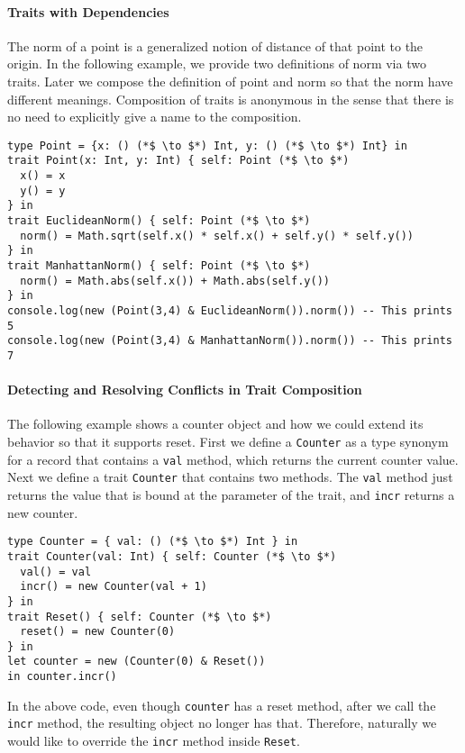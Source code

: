 \paragraph{Traits with Dependencies}
The norm of a point is a generalized notion of distance of that point to the
origin. In the following example, we provide two definitions of norm via two
traits. Later we compose the definition of point and norm so that the norm have
different meanings. Composition of traits is anonymous in the sense that there
is no need to explicitly give a name to the composition.

\begin{lstlisting}
type Point = {x: () (*$ \to $*) Int, y: () (*$ \to $*) Int} in
trait Point(x: Int, y: Int) { self: Point (*$ \to $*)
  x() = x
  y() = y
} in
trait EuclideanNorm() { self: Point (*$ \to $*)
  norm() = Math.sqrt(self.x() * self.x() + self.y() * self.y())
} in
trait ManhattanNorm() { self: Point (*$ \to $*)
  norm() = Math.abs(self.x()) + Math.abs(self.y())
} in
console.log(new (Point(3,4) & EuclideanNorm()).norm()) -- This prints 5
console.log(new (Point(3,4) & ManhattanNorm()).norm()) -- This prints 7
\end{lstlisting}

\paragraph{Detecting and Resolving Conflicts in Trait Composition}
The following example shows a counter object and how we could extend its
behavior so that it supports reset. First we define a \lstinline$Counter$ as a
type synonym for a record that contains a \lstinline$val$ method, which returns
the current counter value. Next we define a trait \lstinline$Counter$ that
contains two methods. The \lstinline$val$ method just returns the value that is
bound at the parameter of the trait, and \lstinline$incr$ returns a new counter.

\begin{lstlisting}
type Counter = { val: () (*$ \to $*) Int } in
trait Counter(val: Int) { self: Counter (*$ \to $*)
  val() = val
  incr() = new Counter(val + 1)
} in
trait Reset() { self: Counter (*$ \to $*)
  reset() = new Counter(0)
} in
let counter = new (Counter(0) & Reset())
in counter.incr()
\end{lstlisting}

In the above code, even though \lstinline$counter$ has a reset method, after we
call the \lstinline$incr$ method, the resulting object no longer has that.
Therefore, naturally we would like to override the \lstinline$incr$ method
inside \lstinline$Reset$.


